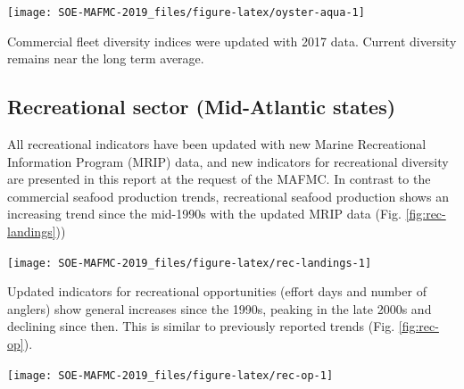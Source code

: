\documentclass[10pt,]{article}
\let\origfigure\figure
\let\endorigfigure\endfigure
\renewenvironment{figure}[1][2] {
    \expandafter\origfigure\expandafter[H]
} {
    \endorigfigure
}
\begin{document}
\begin{figure}

{\centering \texttt{[image: SOE-MAFMC-2019\_files/figure-latex/oyster-aqua-1]} 

}

\caption{Oyster aquaculture production in terms of number of oysters sold from Virginia, Maryland, and New Jersey.}\label{fig:oyster-aqua}
\end{figure}

Commercial fleet diversity indices were updated with 2017 data. Current
diversity remains near the long term average.

\subsection{Recreational sector (Mid-Atlantic
states)}\label{recreational-sector-mid-atlantic-states}

All recreational indicators have been updated with new Marine
Recreational Information Program (MRIP) data, and new indicators for
recreational diversity are presented in this report at the request of
the MAFMC. In contrast to the commercial seafood production trends,
recreational seafood production shows an increasing trend since the
mid-1990s with the updated MRIP data (Fig. \ref{fig:rec-landings}))

\begin{figure}

{\centering \texttt{[image: SOE-MAFMC-2019\_files/figure-latex/rec-landings-1]} 

}

\caption{Total recreational seafood harvest in the Mid-Atlantic region.}\label{fig:rec-landings}
\end{figure}

Updated indicators for recreational opportunities (effort days and
number of anglers) show general increases since the 1990s, peaking in
the late 2000s and declining since then. This is similar to previously
reported trends (Fig. \ref{fig:rec-op}).

\begin{figure}

{\centering \texttt{[image: SOE-MAFMC-2019\_files/figure-latex/rec-op-1]} 

}

\caption{Recreational effort and number of recreational anglers in the Mid-Atlantic.}\label{fig:rec-op}
\end{figure}
\end{document}
